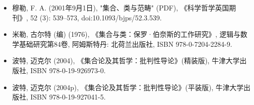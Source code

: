 \begin{itemize}
\item 穆勒, F. A. (2001年9月1日), "集合、类与范畴" (PDF), 《科学哲学英国期刊》, 52 (3): 539–573, doi:10.1093/bjps/52.3.539.  
\item 米勒, 古尔特 (编) (1976), 《集合与类：保罗·伯奈斯的工作研究》, 逻辑与数学基础研究第84卷, 阿姆斯特丹: 北荷兰出版社, ISBN 978-0-7204-2284-9.  
\item 波特, 迈克尔 (2004), 《集合论及其哲学：批判性导论》(精装版), 牛津大学出版社, ISBN 978-0-19-926973-0.  
\item 波特, 迈克尔 (2004p), 《集合论及其哲学：批判性导论》(平装版), 牛津大学出版社, ISBN 978-0-19-927041-5.  


\end{itemize}

